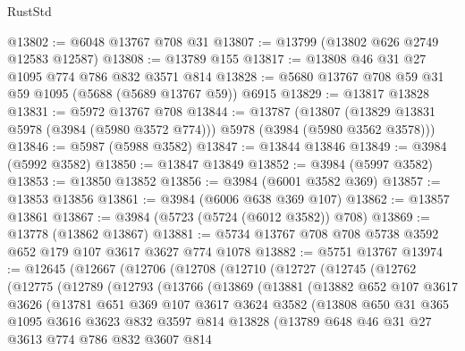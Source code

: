 \begin{lexlean}{RustStd}
\begin{coremodule}
@13802 := @6048 @13767 @708 @31
@13807 := @13799 (@13802 @626 @2749 @12583 @12587)
@13808 := @13789 @155
@13817 := @13808 @46 @31 @27 @1095 @774 @786 @832 @3571 @814
@13828 := @5680 @13767 @708 @59 @31 @59 @1095 (@5688 (@5689 @13767 @59)) @6915
@13829 := @13817 @13828
@13831 := @5972 @13767 @708
@13844 := @13787
    (@13807 (@13829 @13831 @5978 (@3984 (@5980 @3572 @774))) @5978 (@3984 (@5980 @3562 @3578)))
@13846 := @5987 (@5988 @3582)
@13847 := @13844 @13846
@13849 := @3984 (@5992 @3582)
@13850 := @13847 @13849
@13852 := @3984 (@5997 @3582)
@13853 := @13850 @13852
@13856 := @3984 (@6001 @3582 @369)
@13857 := @13853 @13856
@13861 := @3984 (@6006 @638 @369 @107)
@13862 := @13857 @13861
@13867 := @3984 (@5723 (@5724 (@6012 @3582)) @708)
@13869 := @13778 (@13862 @13867)
@13881 := @5734 @13767 @708 @708 @5738 @3592 @652 @179 @107 @3617 @3627 @774 @1078
@13882 := @5751 @13767
@13974 := @12645
    (@12667
      (@12706
        (@12708
          (@12710
            (@12727
              (@12745
                (@12762
                  (@12775
                    (@12789
                      (@12793
                        (@13766
                          (@13869
                            (@13881
                              (@13882
                                @652
                                @107
                                @3617
                                @3626
                                (@13781
                                  @651
                                  @369
                                  @107
                                  @3617
                                  @3624
                                  @3582
                                  (@13808
                                    @650
                                    @31
                                    @365
                                    @1095
                                    @3616
                                    @3623
                                    @832
                                    @3597
                                    @814
                                    @13828
                                    (@13789
                                      @648
                                      @46
                                      @31
                                      @27
                                      @3613
                                      @774
                                      @786
                                      @832
                                      @3607
                                      @814

\end{coremodule}
\end{lexlean}
